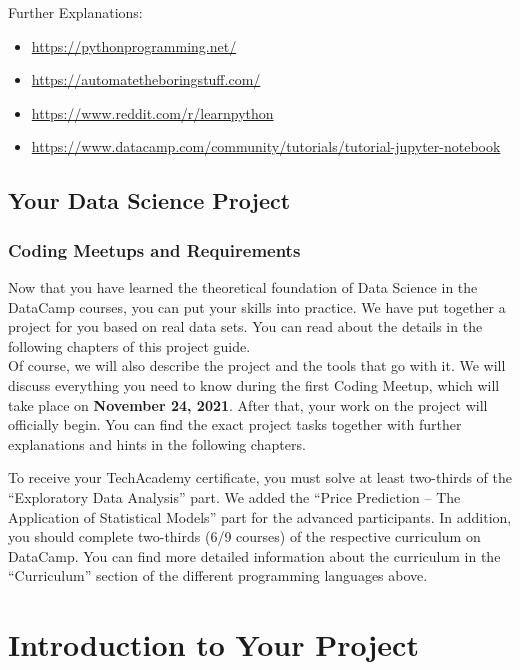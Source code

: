 \documentclass[
  11pt,
]{article}
\providecommand{\tightlist}{%
  \setlength{\itemsep}{0pt}\setlength{\parskip}{0pt}}
\begin{document}
Further Explanations:

\begin{itemize}
\tightlist
\item
  \url{https://pythonprogramming.net/}
\item
  \url{https://automatetheboringstuff.com/}
\item
  \url{https://www.reddit.com/r/learnpython}
\item
  \url{https://www.datacamp.com/community/tutorials/tutorial-jupyter-notebook}
\end{itemize}

\hypertarget{your-data-science-project}{%
\subsection{Your Data Science Project}\label{your-data-science-project}}

\hypertarget{coding-meetups-and-requirements}{%
\subsubsection{Coding Meetups and Requirements}\label{coding-meetups-and-requirements}}

Now that you have learned the theoretical foundation of Data Science in the DataCamp courses, you can put your skills into practice. We have put together a project for you based on real data sets. You can read about the details in the following chapters of this project guide.\\
Of course, we will also describe the project and the tools that go with it. We will discuss everything you need to know during the first Coding Meetup, which will take place on \textbf{November 24, 2021}. After that, your work on the project will officially begin.
You can find the exact project tasks together with further explanations and hints in the following chapters.

To receive your TechAcademy certificate, you must solve at least two-thirds of the ``Exploratory Data Analysis'' part. We added the ``Price Prediction -- The Application of Statistical Models'' part for the advanced participants. In addition, you should complete two-thirds (6/9 courses) of the respective curriculum on DataCamp. You can find more detailed information about the curriculum in the ``Curriculum'' section of the different programming languages above.

\newpage

\hypertarget{introduction-to-your-project}{%
\section{Introduction to Your Project}\label{introduction-to-your-project}}
\end{document}
